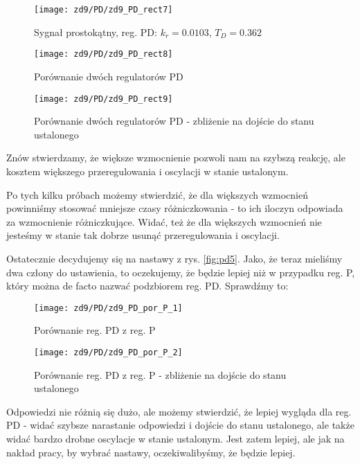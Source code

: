 \documentclass[11 pt]{article}
\begin{document}
\begin{figure}[h!]
	\centerline{
	\texttt{[image: zd9/PD/zd9\_PD\_rect7]}
	}
	\caption{Sygnał prostokątny, reg. PD: $k_r = 0.0103$, $T_D = 0.362$}
\end{figure}

\begin{figure}[h!]
	\centerline{
	\texttt{[image: zd9/PD/zd9\_PD\_rect8]}
	}
	\caption{Porównanie dwóch regulatorów PD}
\end{figure}

\newpage

\begin{figure}[h!]
	\centerline{
	\texttt{[image: zd9/PD/zd9\_PD\_rect9]}
	}
	\caption{Porównanie dwóch regulatorów PD - zbliżenie na dojście do stanu ustalonego}
\end{figure}

Znów stwierdzamy, że większe wzmocnienie pozwoli nam na szybszą reakcję, ale kosztem większego przeregulowania i oscylacji w stanie ustalonym.

Po tych kilku próbach możemy stwierdzić, że dla większych wzmocnień powinniśmy stosować mniejsze czasy różniczkowania - to ich iloczyn odpowiada za wzmocnienie różniczkujące. Widać, też że dla większych wzmocnień nie jesteśmy w stanie tak dobrze usunąć przeregulowania i oscylacji.

Ostatecznie decydujemy się na nastawy z rys. \ref{fig:pd5}. Jako, że teraz mieliśmy dwa człony do ustawienia, to oczekujemy, że będzie lepiej niż w przypadku reg. P, który można de facto nazwać podzbiorem reg. PD. Sprawdźmy to:

\begin{figure}[h!]
	\centerline{
	\texttt{[image: zd9/PD/zd9\_PD\_por\_P\_1]}
	}
	\caption{Porównanie reg. PD z reg. P}
\end{figure}

\newpage

\begin{figure}[h!]
	\centerline{
	\texttt{[image: zd9/PD/zd9\_PD\_por\_P\_2]}
	}
	\caption{Porównanie reg. PD z reg. P - zbliżenie na dojście do stanu ustalonego}
\end{figure}

Odpowiedzi nie różnią się dużo, ale możemy stwierdzić, że lepiej wygląda dla reg. PD - widać szybsze narastanie odpowiedzi i dojście do stanu ustalonego, ale także widać bardzo drobne oscylacje w stanie ustalonym. Jest zatem lepiej, ale jak na nakład pracy, by wybrać nastawy, oczekiwalibyśmy, że będzie lepiej.
\end{document}
